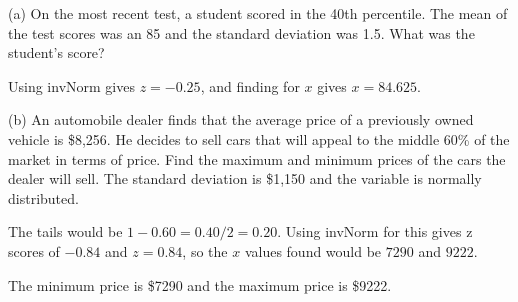 \documentclass[../stats.tex]{subfiles}
\begin{document}
\pagebreak
\begin{example}
    (a) On the most recent test, a student scored in the 40th percentile. The mean of the test scores was an 85 and the standard deviation was 1.5. What was the student's score?

    Using invNorm gives $z=-0.25$, and finding for $x$ gives $x=84.625$.

    (b) An automobile dealer finds that the average price of a previously owned vehicle is \$8,256. He decides to sell cars that will appeal to the 
    middle 60\% of the market in terms of price. Find the maximum and minimum prices of the cars the dealer will sell.
    The standard deviation is \$1,150 and the variable is normally distributed.
    
    The tails would be $1-0.60=0.40/2 = 0.20$. Using invNorm for this gives z scores of $-0.84$ and $z=0.84$, so the $x$ values found would be $7290$ and $9222$.

    The minimum price is \$7290 and the maximum price is \$9222.
\end{example}
\end{document}
